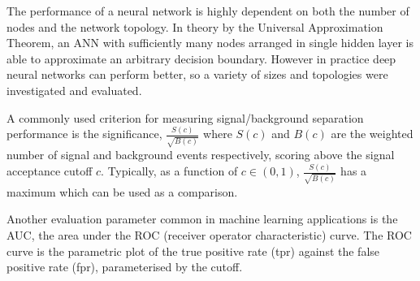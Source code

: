 
The performance of a neural network is highly dependent on both the number of nodes and the network topology. 
In theory by the Universal Approximation Theorem, an ANN with sufficiently many nodes arranged in single hidden layer is able to approximate an arbitrary decision boundary. However in practice deep neural networks can perform better, so a variety of sizes and topologies were investigated and evaluated. 

A commonly used criterion for measuring signal/background separation performance is the significance, $\frac{S(c)}{\sqrt{B(c)}}$ where $S(c)$ and $B(c)$ are the weighted number of signal and background events respectively, scoring above the signal acceptance cutoff $c$. Typically,  as a function of $ c \in (0,1)$, $\frac{S(c)}{\sqrt{B(c)}}$ has a maximum which can be used as a comparison.

Another evaluation parameter common in machine learning applications is the AUC, the area under the ROC (receiver operator characteristic) curve.
The ROC curve is the parametric plot of the true positive rate (tpr) against the false positive rate (fpr), parameterised by the cutoff.

